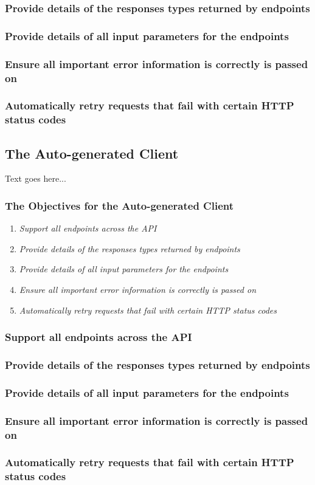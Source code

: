 \subsubsection{Provide details of the responses types returned by endpoints}
\subsubsection{Provide details of all input parameters for the endpoints}
\subsubsection{Ensure all important error information is correctly is passed on}
\subsubsection{Automatically retry requests that fail with certain HTTP status codes}
\subsection{The Auto-generated Client}
Text goes here...
\subsubsection{The Objectives for the Auto-generated Client}
\begin{enumerate}
    \item \textit{Support all endpoints across the API}
    \item \textit{Provide details of the responses types returned by endpoints}
    \item \textit{Provide details of all input parameters for the endpoints}
    \item \textit{Ensure all important error information is correctly is passed on}
    \item \textit{Automatically retry requests that fail with certain HTTP status codes}
\end{enumerate}
\subsubsection{Support all endpoints across the API}
\subsubsection{Provide details of the responses types returned by endpoints}
\subsubsection{Provide details of all input parameters for the endpoints}
\subsubsection{Ensure all important error information is correctly is passed on}
\subsubsection{Automatically retry requests that fail with certain HTTP status codes}